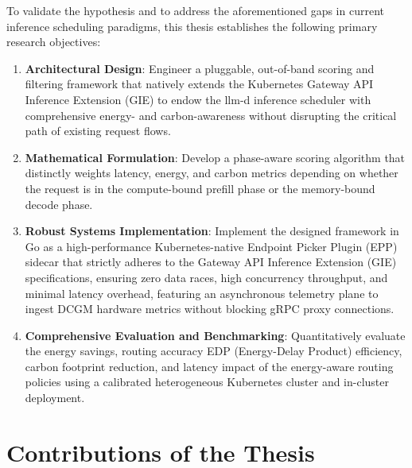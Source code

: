 \documentclass[12pt,a4paper,oneside]{report}
\begin{document}
To validate the hypothesis and to address the aforementioned gaps in current inference scheduling paradigms, this thesis establishes the following primary research objectives:
\begin{enumerate}
    \item \textbf{Architectural Design}: Engineer a pluggable, out-of-band scoring and filtering framework that natively extends the Kubernetes Gateway API Inference Extension (GIE) to endow the llm-d inference scheduler with comprehensive energy- and carbon-awareness without disrupting the critical path of existing request flows.
    \item \textbf{Mathematical Formulation}: Develop a phase-aware scoring algorithm that distinctly weights latency, energy, and carbon metrics depending on whether the request is in the compute-bound prefill phase or the memory-bound decode phase.
    \item \textbf{Robust Systems Implementation}: Implement the designed framework in Go as a high-performance Kubernetes-native Endpoint Picker Plugin (EPP) sidecar that strictly adheres to the Gateway API Inference Extension (GIE) specifications, ensuring zero data races, high concurrency throughput, and minimal latency overhead, featuring an asynchronous telemetry plane to ingest DCGM hardware metrics without blocking gRPC proxy connections.
    \item \textbf{Comprehensive Evaluation and Benchmarking}: Quantitatively evaluate the energy savings, routing accuracy EDP (Energy-Delay Product) efficiency, carbon footprint reduction, and latency impact of the energy-aware routing policies using a calibrated heterogeneous Kubernetes cluster and in-cluster deployment.
\end{enumerate}

\section{Contributions of the Thesis}
\label{sec:intro_contributions}
\end{document}
